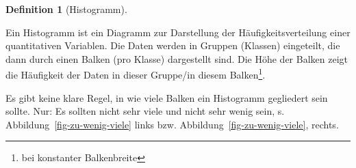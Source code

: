 \documentclass[
  a4paper,
  DIV=11]{scrreprt}
\theoremstyle{definition}
\theoremstyle{definition}
\theoremstyle{definition}
\newtheorem{definition}{Definition}[chapter]
\theoremstyle{remark}
\begin{document}
\begin{definition}[Histogramm]\protect\hypertarget{def-histogramm}{}\label{def-histogramm}

Ein Histogramm ist ein Diagramm zur Darstellung der
Häufigkeitsverteilung einer quantitativen Variablen. Die Daten werden in
Gruppen (Klassen) eingeteilt, die dann durch einen Balken (pro Klasse)
dargestellt sind. Die Höhe der Balken zeigt die Häufigkeit der Daten in
dieser Gruppe/in diesem Balken\footnote{bei konstanter Balkenbreite}.

\end{definition}

Es gibt keine klare Regel, in wie viele Balken ein Histogramm gegliedert
sein sollte. Nur: Es sollten nicht sehr viele und nicht sehr wenig sein,
s. Abbildung~\ref{fig-zu-wenig-viele} links bzw.
Abbildung~\ref{fig-zu-wenig-viele}, rechts.
\end{document}
